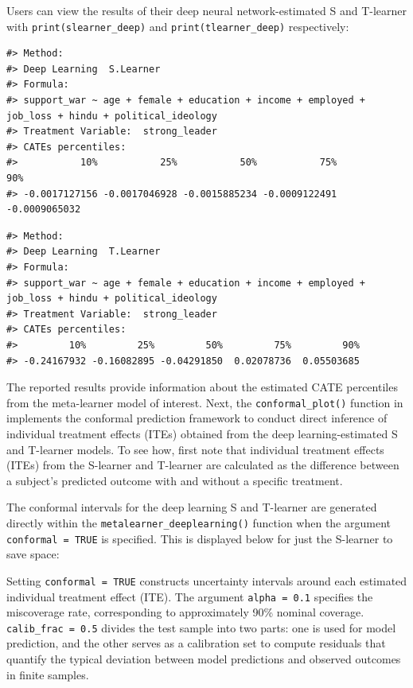 Users can view the results of their deep neural network-estimated S and
T-learner with \texttt{print(slearner\_deep)} and \texttt{print(tlearner\_deep)}
respectively:

\begin{verbatim}
#> Method:
#> Deep Learning  S.Learner
#> Formula:
#> support_war ~ age + female + education + income + employed +      job_loss + hindu + political_ideology
#> Treatment Variable:  strong_leader
#> CATEs percentiles:
#>           10%           25%           50%           75%           90% 
#> -0.0017127156 -0.0017046928 -0.0015885234 -0.0009122491 -0.0009065032
\end{verbatim}

\begin{verbatim}
#> Method:
#> Deep Learning  T.Learner
#> Formula:
#> support_war ~ age + female + education + income + employed +      job_loss + hindu + political_ideology
#> Treatment Variable:  strong_leader
#> CATEs percentiles:
#>         10%         25%         50%         75%         90% 
#> -0.24167932 -0.16082895 -0.04291850  0.02078736  0.05503685
\end{verbatim}

The reported results provide information about the estimated CATE
percentiles from the meta-learner model of interest. Next, the
\texttt{conformal\_plot()} function in  implements the
conformal prediction framework to conduct direct inference of individual
treatment effects (ITEs) obtained from the deep learning-estimated S and
T-learner models. To see how, first note that individual treatment
effects (ITEs) from the S-learner and T-learner are calculated as the
difference between a subject's predicted outcome with and without a
specific treatment.

The conformal intervals for the deep learning S and T-learner are
generated directly within the \texttt{metalearner\_deeplearning()} function when
the argument \texttt{conformal\ =\ TRUE} is specified. This is displayed below
for just the S-learner to save space:

Setting \texttt{conformal\ =\ TRUE} constructs uncertainty intervals around each
estimated individual treatment effect (ITE). The argument \texttt{alpha\ =\ 0.1}
specifies the miscoverage rate, corresponding to approximately 90\%
nominal coverage. \texttt{calib\_frac\ =\ 0.5} divides the test sample into two
parts: one is used for model prediction, and the other serves as a
calibration set to compute residuals that quantify the typical deviation
between model predictions and observed outcomes in finite samples.

